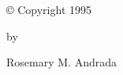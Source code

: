 
\newpage


\par\vspace*{2.5in}

\begin{center}

\copyright\/ Copyright 1995

by

Rosemary M. Andrada

\end{center}
